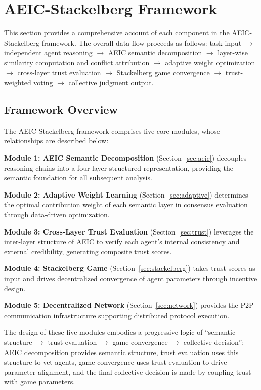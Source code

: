 \documentclass[12pt,a4paper]{article}
\begin{document}
\section{AEIC-Stackelberg Framework}\label{sec:framework}

This section provides a comprehensive account of each component in the AEIC-Stackelberg framework. The overall data flow proceeds as follows: task input $\to$ independent agent reasoning $\to$ AEIC semantic decomposition $\to$ layer-wise similarity computation and conflict attribution $\to$ adaptive weight optimization $\to$ cross-layer trust evaluation $\to$ Stackelberg game convergence $\to$ trust-weighted voting $\to$ collective judgment output.

\subsection{Framework Overview}

The AEIC-Stackelberg framework comprises five core modules, whose relationships are described below:

\textbf{Module 1: AEIC Semantic Decomposition} (Section~\ref{sec:aeic}) decouples reasoning chains into a four-layer structured representation, providing the semantic foundation for all subsequent analysis.

\textbf{Module 2: Adaptive Weight Learning} (Section~\ref{sec:adaptive}) determines the optimal contribution weight of each semantic layer in consensus evaluation through data-driven optimization.

\textbf{Module 3: Cross-Layer Trust Evaluation} (Section~\ref{sec:trust}) leverages the inter-layer structure of AEIC to verify each agent's internal consistency and external credibility, generating composite trust scores.

\textbf{Module 4: Stackelberg Game} (Section~\ref{sec:stackelberg}) takes trust scores as input and drives decentralized convergence of agent parameters through incentive design.

\textbf{Module 5: Decentralized Network} (Section~\ref{sec:network}) provides the P2P communication infrastructure supporting distributed protocol execution.

The design of these five modules embodies a progressive logic of ``semantic structure $\to$ trust evaluation $\to$ game convergence $\to$ collective decision'': AEIC decomposition provides semantic structure, trust evaluation uses this structure to vet agents, game convergence uses trust evaluation to drive parameter alignment, and the final collective decision is made by coupling trust with game parameters.
\end{document}
